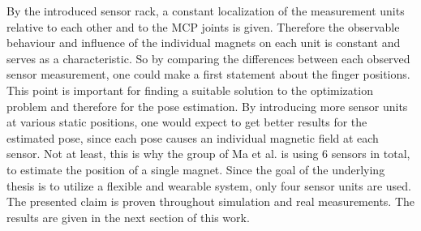 By the introduced sensor rack, a constant localization of the measurement units relative to each other and to the \ac{MCP} joints is given. Therefore the observable behaviour and influence of the individual magnets on each unit is constant and serves as a characteristic. So by comparing the differences between each observed sensor measurement, one could make a first statement about the finger positions. This point is important for finding a suitable solution to the optimization problem and therefore for the pose estimation. By introducing more sensor units at various static positions, one would expect to get better results for the estimated pose, since each pose causes an individual magnetic field at each sensor. Not at least, this is why the group of Ma et al. is using 6 sensors in total, to estimate the position of a single magnet. Since the goal of the underlying thesis is to utilize a flexible and wearable system, only four sensor units are used. The presented claim is proven throughout simulation and real measurements. The results are given in the next section of this work.




